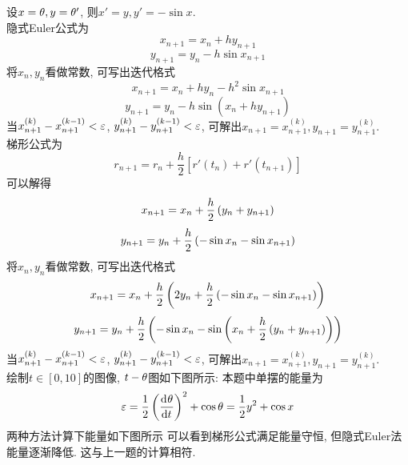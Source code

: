 \documentclass[UTF8,9pt]{ctexart}
\begin{document}
设$x=\theta,y=\theta'$, 则$x'=y, y' = -\sin x$.\\
隐式Euler公式为$$x_{n+1} = x_n+hy_{n+1}$$
$$y_{n+1} = y_n-h\sin x_{n+1}$$
将$x_n,y_n$看做常数, 可写出迭代格式
$$x_{n+1}=x_n+hy_n-h^2\sin x_{n+1}$$
$$y_{n+1} = y_n - h\sin(x_n+hy_{n+1})$$
当$x_{n+1}^{(k)}-x_{n+1}^{(k-1)}<\varepsilon$, $y_{n+1}^{(k)}-y_{n+1}^{(k-1)}<\varepsilon$, 可解出$x_{n+1}=x_{n+1}^{(k)}, y_{n+1}=y_{n+1}^{(k)}$.\\
梯形公式为$$ 
 r_{n+1}=r_{n}+\frac{h}{2}\left[r'\left(t_{n}\right)+r'\left(t_{n+1}\right)\right]$$
 可以解得
 $$ x_{n+1}=x_n+\frac{h}{2}\left( y_n+y_{n+1} \right)$$
 $$y_{n+1} = y_n+\frac{h}{2}\left( -\sin x_n-\sin x_{n+1} \right)$$
 将$x_n,y_n$看做常数, 可写出迭代格式
$$x_{n+1}=x_n+\frac{h}{2}\left( 2y_n+\frac{h}{2}\left( -\sin x_n-\sin x_{n+1} \right) \right)$$
$$y_{n+1} = y_n+\frac{h}{2}\left( -\sin x_n-\sin \left( x_n+\frac{h}{2}\left( y_n+y_{n+1} \right) \right) \right)$$
当$x_{n+1}^{(k)}-x_{n+1}^{(k-1)}<\varepsilon$, $y_{n+1}^{(k)}-y_{n+1}^{(k-1)}<\varepsilon$, 可解出$x_{n+1}=x_{n+1}^{(k)}, y_{n+1}=y_{n+1}^{(k)}$.\\
绘制$t\in[0,10]$的图像, $t-\theta$图如下图所示:
 本题中单摆的能量为
 $$\varepsilon = \frac{1}{2}\left( \frac{\mathrm{d}^{} \theta}{\mathrm{d} t^{}} \right)^2+\cos\theta = \frac{1}{2}y^2+\cos x$$
两种方法计算下能量如下图所示
可以看到梯形公式满足能量守恒, 但隐式Euler法能量逐渐降低. 这与上一题的计算相符. 
\newpage
{}
\end{document}
